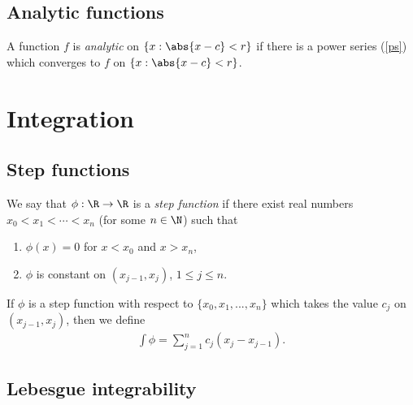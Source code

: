 \documentclass{article}
\begin{document}
\subsection{Analytic functions}

\begin{definition}
    A function $f$ is \emph{analytic} on $\{x: \abs{x-c}<r\}$ if there is a power
    series (\ref{ps}) which converges to $f$ on $\{x: \abs{x-c}<r\}$.
\end{definition}

\section{Integration}

\subsection{Step functions}

\begin{definition}[Notes 4.1]
    We say that $\phi:\R\to\R$ is a \emph{step function} if there exist real numbers 
    $x_0<x_1<\cdots < x_n$ (for some $n\in\N$) such that 
    \begin{enumerate}
        \item $\phi(x)=0$ for $x<x_0$ and $x>x_n$,
        \item $\phi$ is constant on $(x_{j-1}, x_j)$, $1\leq j\leq n$.
    \end{enumerate}
\end{definition}

\begin{definition}[Notes 4.2]
    If $\phi$ is a step function with respect to $\{x_0, x_1, ..., x_n\}$ which takes the 
    value $c_j$ on $(x_{j-1}, x_j)$, then we define
    \begin{align*}
        \int \phi = \sum_{j=1}^n c_j(x_j-x_{j-1}).
    \end{align*}
\end{definition}

\subsection{Lebesgue integrability}
\end{document}
